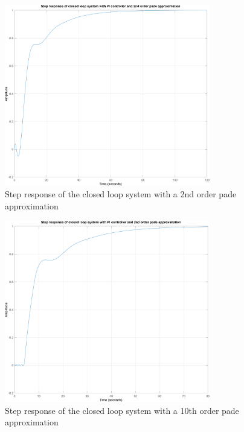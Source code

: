 \begin{figure}[h!]
	\centering
	\includegraphics[width=0.8\textwidth]{Pictures/StepResponse_Pade2.png}
	
	\caption{Step response of the closed loop system with a 2nd order pade approximation}
	\label{fig:StepResponse_Pade2}
\end{figure}


\begin{figure}[h!]
	\centering
	\includegraphics[width=0.8\textwidth]{Pictures/StepResponse_Pade10.png}
	
	\caption{Step response of the closed loop system with a 10th order pade approximation}
	\label{fig:StepResponse_Pade10}
\end{figure}


